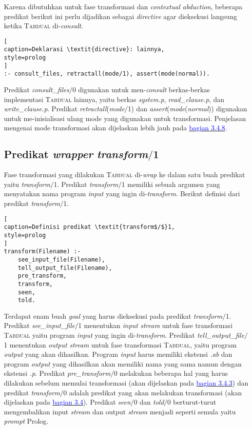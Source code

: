Karena dibutuhkan untuk fase transformasi dan \textit{contextual abduction}, beberapa predikat berikut ini perlu dijadikan sebagai \textit{directive} agar dieksekusi langsung ketika \textsc{Tabdual} di-\textit{consult}.
\\

\begin{lstlisting}[
caption=Deklarasi \textit{directive}: lainnya,
style=prolog
]
:- consult_files, retractall(mode/1), assert(mode(normal)).
\end{lstlisting}

Predikat \textit{consult\_files$/$}0 digunakan untuk men-\textit{consult} berkas-berkas implementasi \textsc{Tabdual} lainnya, yaitu berkas \textit{system.p}, \textit{read\_clause.p}, dan \textit{write\_clause.p}. Predikat \textit{retractall}(\textit{mode$/$}1) dan \textit{assert}(\textit{mode}(\textit{normal})) digunakan untuk me-inisialisasi ulang mode yang digunakan untuk transformasi. Penjelasan mengenai mode transformasi akan dijelaskan lebih jauh pada \hyperref[subsec:mode]{\textcolor{blue}{bagian 3.4.8}}.

\subsection{Predikat \textit{wrapper} \textit{transform$/$}1}

Fase transformasi yang dilakukan \textsc{Tabdual} di-\textit{wrap} ke dalam satu buah predikat yaitu \textit{transform$/$}1. Predikat \textit{transform$/$}1 memiliki sebuah argumen yang menyatakan nama program \textit{input} yang ingin di-\textit{transform}. Berikut definisi dari predikat \textit{transform$/$}1.
\\

\begin{lstlisting}[
caption=Definisi predikat \textit{transform$/$}1,
style=prolog
]
transform(Filename) :-
	see_input_file(Filename),
	tell_output_file(Filename),
	pre_transform,
	transform,
	seen,
	told.
\end{lstlisting}

Terdapat enam buah \textit{goal} yang harus dieksekusi pada predikat \textit{transform$/$}1. Predikat \textit{see\_input\_file$/$}1 menentukan \textit{input stream} untuk fase transformasi \textsc{Tabdual} yaitu program \textit{input} yang ingin di-\textit{transform}. Predikat \textit{tell\_output\_file$/$}1 menentukan \textit{output stream} untuk fase transformasi \textsc{Tabdual}, yaitu program \textit{output} yang akan dihasilkan. Program \textit{input} harus memiliki ekstensi \textit{.ab} dan program \textit{output} yang dihasilkan akan memiliki nama yang sama namun dengan ekstensi \textit{.p}. Predikat \textit{pre\_transform$/$}0 melakukan beberapa hal yang harus dilakukan sebelum memulai transformasi (akan dijelaskan pada \hyperref[subsec:pre_transform]{\textcolor{blue}{bagian 3.4.3}}) dan predikat \textit{transform$/$}0 adalah predikat yang akan melakukan  transformasi (akan dijelaskan pada \hyperref[transform]{\textcolor{blue}{bagian 3.4}}). Predikat \textit{seen$/$}0 dan \textit{told$/$}0 berturut-turut mengembalikan input \textit{stream} dan output \textit{stream} menjadi seperti semula yaitu \textit{prompt} Prolog.

